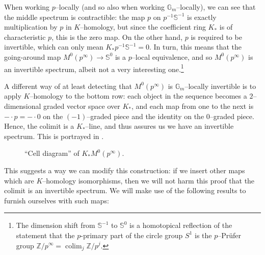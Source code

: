 \documentclass{amsart}
\newcommand{\Z}{\mathbb Z}
\renewcommand{\S}{\mathbb S}
\newcommand{\G}{\mathbb G}
\newcommand{\<}{\langle}
\renewcommand{\>}{\rangle}
\DeclareMathOperator{\colim}{colim}
\theoremstyle{plain}
\theoremstyle{definition}
\theoremstyle{remark}
\begin{document}
When working $p$--locally (and so also when working $\G_m$--locally), we can see that the middle spectrum is contractible: the map $p$ on $p^{-1} \S^{-1}$ is exactly multiplication by $p$ in $K$--homology, but since the coefficient ring $K_*$ is of characteristic $p$, this is the zero map.  On the other hand, $p$ is required to be invertible, which can only mean $K_* p^{-1} \S^{-1} = 0$.  In turn, this means that the going-around map $M^0(p^\infty) \to \S^0$ is a $p$--local equivalence, and so $M^0(p^\infty)$ is an invertible spectrum, albeit not a very interesting one.\footnote{The dimension shift from $\S^{-1}$ to $\S^0$ is a homotopical reflection of the statement that the $p$-primary part of the circle group $S^1$ is the $p$--Pr\"ufer group $\Z/p^\infty = \colim_j \Z/p^j$.}

A different way of at least detecting that $M^0(p^\infty)$ is $\G_m$--locally invertible is to apply $K$--homology to the bottom row: each object in the sequence becomes a $2$--dimensional graded vector space over $K_*$, and each map from one to the next is $- \cdot p = - \cdot 0$ on the $(-1)$--graded piece and the identity on the $0$--graded piece.  Hence, the colimit is a $K_*$--line, and  thus assures us we have an invertible spectrum.  This is portrayed in .
\begin{figure}[h]
\begin{center}
\end{center}
\caption{``Cell diagram'' of $K_* M^0(p^\infty)$.}\label{CellDiagramFigure}
\end{figure}
This suggests a way we can modify this construction: if we insert other maps which are $K$--homology isomorphisms, then we will not harm this proof that the colimit is an invertible spectrum.  We will make use of the following results to furnish ourselves with such maps:
\end{document}
